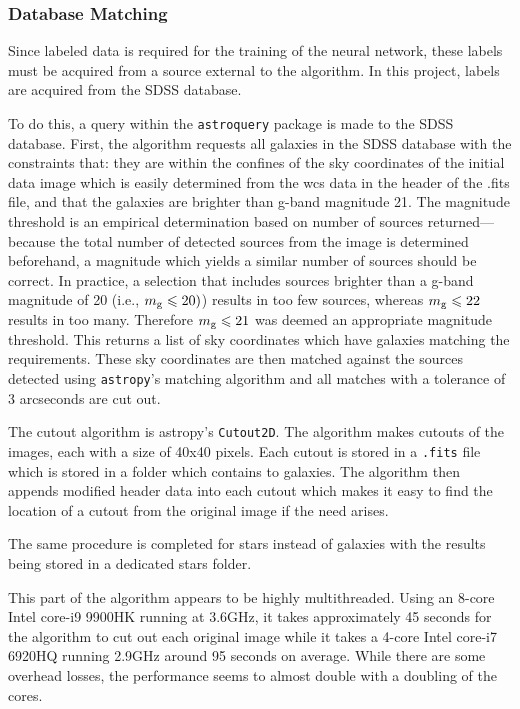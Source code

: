\documentclass[a4paper,fleqn,usenatbib]{mnras}
\begin{document}
\subsubsection{Database Matching}
Since labeled data is required for the training of the neural network, these labels must be acquired from a source external to the algorithm. In this project, labels are acquired from the SDSS database. 

To do this, a query within the \texttt{astroquery} package is made to the SDSS database. First, the algorithm requests all galaxies in the SDSS database with the constraints that: they are within the confines of the sky coordinates of the initial data image which is easily determined from the wcs data in the header of the .fits file, and that the galaxies are brighter than g-band magnitude 21. The magnitude threshold is an empirical determination based on number of sources returned---because the total number of detected sources from the image is determined beforehand, a magnitude which yields a similar number of sources should be correct. In practice, a selection that includes sources brighter than a g-band magnitude of 20 (i.e., $m_{\rm g}\leq20)$) results in too few sources, whereas $m_{\rm g}\leq22$ results in too many. Therefore $m_{\rm g}\leq21$ was deemed an appropriate magnitude threshold. 
This returns a list of sky coordinates which have galaxies matching the requirements. These sky coordinates are then matched against the sources detected using \texttt{astropy}'s matching algorithm and all matches with a tolerance of 3 arcseconds are cut out. 

The cutout algorithm is astropy's \texttt{Cutout2D}. The algorithm makes cutouts of the images, each with a size of 40x40 pixels. Each cutout is stored in a \texttt{.fits} file which is stored in a folder which contains to galaxies. The algorithm then appends modified header data into each cutout which makes it easy to find the location of a cutout from the original image if the need arises. 

The same procedure is completed for stars instead of galaxies with the results being stored in a dedicated stars folder. 

This part of the algorithm appears to be highly multithreaded. Using an 8-core Intel core-i9 9900HK running at 3.6GHz, it takes approximately 45 seconds for the algorithm to cut out each original image while it takes a 4-core Intel core-i7 6920HQ running 2.9GHz around 95 seconds on average. While there are some overhead losses, the performance seems to almost double with a doubling of the cores.
\end{document}
